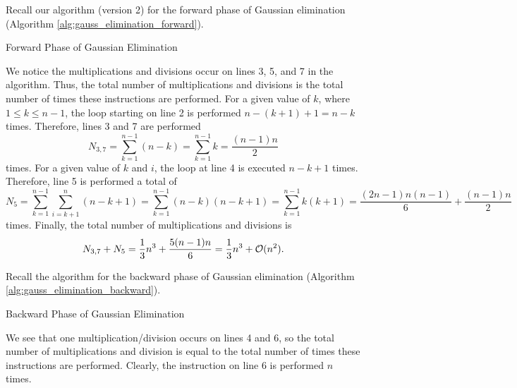\documentclass{homework}
\begin{document}
	\question
	\begin{alphaparts}
		\questionpart
		Recall our algorithm (version 2) for the forward phase of Gaussian elimination (Algorithm \ref{alg:gauss_elimination_forward}).
		\begin{algorithm}[h]
			\caption{Forward Phase of Gaussian Elimination}
			\label{alg:gauss_elimination_forward}
		\end{algorithm}
		We notice the multiplications and divisions occur on lines 3, 5, and 7 in the algorithm. Thus, the total number of multiplications and divisions is the total number of times these instructions are performed. For a given value of $k$, where $1 \le k \le n-1$, the loop starting on line 2 is performed $n - (k+1) + 1 = n-k$ times. Therefore, lines 3 and 7 are performed
		\begin{equation}
			N_{3,7} = \sum_{k=1}^{n-1}(n-k) = \sum_{k=1}^{n-1} k = \frac{(n-1)n}{2}
		\end{equation}
		times. For a given value of $k$ and $i$, the loop at line 4 is executed $n-k+1$ times. Therefore, line 5 is performed a total of
		\begin{equation}
			N_5 = \sum_{k=1}^{n-1}\sum_{i=k+1}^n (n-k+1) = \sum_{k=1}^{n-1}(n-k)(n-k+1) = \sum_{k=1}^{n-1}k(k+1) =\frac{(2n-1)n(n-1)}{6} + \frac{(n-1)n}{2}
		\end{equation}
		times. Finally, the total number of multiplications and divisions is
		\begin{equation}
			N_{3,7} + N_5 = \frac{1}{3}n^3 + \frac{5(n-1)n}{6} = \frac{1}{3}n^3 + \mathcal{O}(n^2).
		\end{equation}
		
		\questionpart
		Recall the algorithm for the backward phase of Gaussian elimination (Algorithm \ref{alg:gauss_elimination_backward}).
		\begin{algorithm}[h]
			\caption{Backward Phase of Gaussian Elimination}
			\label{alg:gauss_elimination_backward}
		\end{algorithm}
		We see that one multiplication/division occurs on lines 4 and 6, so the total number of multiplications and division is equal to the total number of times these instructions are performed. Clearly, the instruction on line 6 is performed $n$ times.
		

\end{alphaparts}
\end{document}
